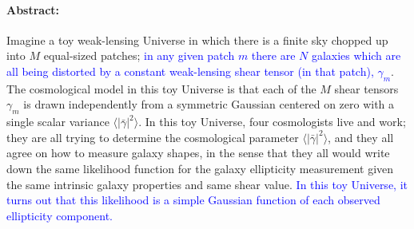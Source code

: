 \documentclass[12pt]{article}
\def\shearvar{\langle |\bar{\gamma}|^2\rangle}
\def\phil#1{\textcolor{blue}{#1}}
\begin{document}
\paragraph{Abstract:}
Imagine a toy weak-lensing Universe in which there is a finite sky chopped up
into $M$ equal-sized patches; \phil{in any given patch $m$ there are $N$
galaxies which are all being  distorted by a constant weak-lensing shear
tensor (in that patch), $\gamma_m$}.  The cosmological model in this toy
Universe is that each of the $M$ shear tensors $\gamma_m$ is drawn
independently from a symmetric Gaussian centered on zero with a single scalar
variance $\shearvar$.  In this toy Universe, four cosmologists live and work;
they are all trying to determine the cosmological parameter $\shearvar$, and
they all agree on how to measure galaxy shapes, in the sense that they all
would write down the same likelihood function for the galaxy ellipticity
measurement given the same intrinsic galaxy properties and same shear value.
\phil{In this toy Universe, it turns out that this likelihood is a simple
Gaussian function of each observed ellipticity component.}
\end{document}
